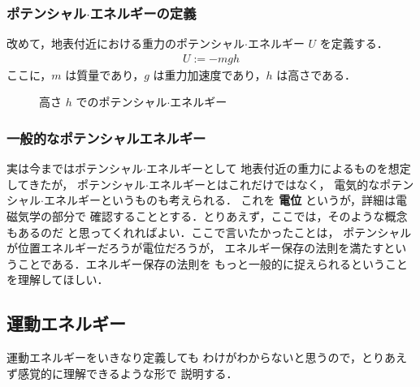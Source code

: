             \subsubsection{ポテンシャル$\cdot$エネルギーの定義}
                改めて，地表付近における重力のポテンシャル$\cdot$エネルギー $U$ を定義する．
                    \begin{align}
                        U := -mgh
                    \end{align}
                ここに，$m$ は質量であり，$g$ は重力加速度であり，$h$ は高さである．
                    \begin{figure}[hbt]
                        \begin{center}
                            \caption{高さ $h$ でのポテンシャル$\cdot$エネルギー}
                            \label{fig:itienerugi}
                        \end{center}
                    \end{figure}

            \subsubsection{一般的なポテンシャルエネルギー}
                実は今まではポテンシャル$\cdot$エネルギーとして
                地表付近の重力によるものを想定してきたが，
                ポテンシャル$\cdot$エネルギーとはこれだけではなく，
                電気的なポテンシャル$\cdot$エネルギーというものも考えられる．
                これを \textbf{電位} というが，詳細は電磁気学の部分で
                確認することとする．とりあえず，ここでは，そのような概念もあるのだ
                と思ってくれればよい．ここで言いたかったことは，
                ポテンシャルが位置エネルギーだろうが電位だろうが，
                エネルギー保存の法則を満たすということである．エネルギー保存の法則を
                もっと一般的に捉えられるということを理解してほしい．

        \subsection{運動エネルギー}
            \begin{mycomment}
                運動エネルギーをいきなり定義しても
                わけがわからないと思うので，とりあえず感覚的に理解できるような形で
                説明する．
            \end{mycomment}

